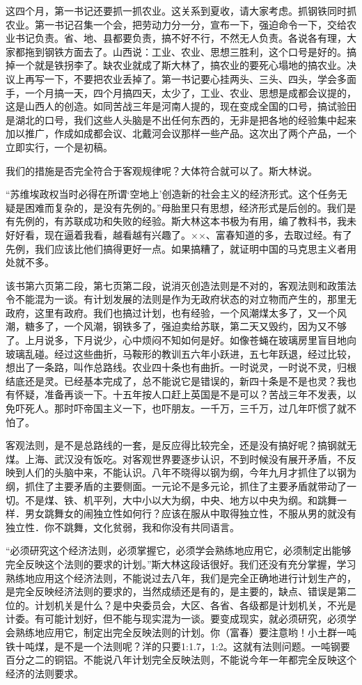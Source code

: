 这四个月，第一书记还要抓一抓农业。这关系到夏收，请大家考虑。抓钢铁同时抓农业。第一书记召集一个会，把劳动力分一分，宣布一下，强迫命令一下，交给农业书记负责。省、地、县都要负责，搞不好不行，不然无人负责。各说各有理，大家都拖到钢铁方面去了。山西说：工业、农业、思想三胜利，这个口号是好的。搞掉一个就是铁拐李了。缺农业就成了斯大林了，搞农业的要死心塌地的搞农业。决议上再写一下，不要把农业丢掉了。第一书记要心挂两头、三头、四头，学会多面手，一个月搞一天，四个月搞四天，太少了，工业、农业、思想是成都会议提的，这是山西人的创造。如同苦战三年是河南人提的，现在变成全国的口号，搞试验田是湖北的口号，我们这些人头脑是不出任何东西的，无非是把各地的经验集中起来加以推广，作成如成都会议、北戴河会议那样一些产品。这次出了两个产品，一个立即实行，一个是初稿。

我们的措施是否完全符合于客观规律呢？大体符合就可以了。斯大林说。

“苏维埃政权当时必得在所谓‘空地上’创造新的社会主义的经济形式。这个任务无疑是困难而复杂的，是没有先例的。”母胎里只有思想，经济形式是后创的。我们是有先例的，有苏联成功和失败的经验。斯大林这本书极为有用，编了教科书，我未好好看，现在逼着我看，越看越有兴趣了。××、富春知道的多，去取过经。有了先例，我们应该比他们搞得更好一点。如果搞糟了，就证明中国的马克思主义者用处就不多。

该书第六页第二段，第七页第二段，说消灭创造法则是不对的，客观法则和政策法令不能混为一谈。有计划发展的法则是作为无政府状态的对立物而产生的，那里无政府，这里有政府。我们也搞过计划，也有经验，一个风潮煤太多了，又一个风潮，糖多了，一个风潮，钢铁多了，强迫卖给苏联，第二天又毁约，因为又不够了。上月说多，下月说少，心中烦闷不知如何是好。如像苍蝇在玻璃房里盲目地向玻璃乱碰。经过这些曲折，马鞍形的教训五六年小跃进，五七年跃退，经过比较，想出了一条路，叫作总路线。农业四十条也有曲折。一时说灵，一时说不灵，归根结底还是灵。已经基本完成了，总不能说它是错误的，新四十条是不是也灵？我也有怀疑，准备再谈一下。十五年按人口赶上英国是不是可以？苦战三年不发表，以免吓死人。那时吓帝国主义一下，也吓朋友。一千万，三千万，过几年吓惯了就不怕了。

客观法则，是不是总路线的一套，是反应得比较完全，还是没有搞好呢？搞钢就无煤。上海、武汉没有饭吃。对客观世界要逐步认识，不到时候没有展开矛盾，不反映到人们的头脑中来，不能认识。八年不晓得以钢为纲，今年九月才抓住了以钢为纲，抓住了主要矛盾的主要侧面。一元论不是多元论，抓住了主要矛盾就带动了一切。不是煤、铁、机平列，大中小以大为纲，中央、地方以中央为纲。和跳舞一样．男女跳舞女的闹独立性如何行？应该在服从中取得独立性，不服从男的就没有独立性．你不跳舞，文化贫弱，我和你没有共同语言。

“必须研究这个经济法则，必须掌握它，必须学会熟练地应用它，必须制定出能够完全反映这个法则的要求的计划。”斯大林这段话很好。我们还没有充分掌握，学习熟练地应用这个经济法则，不能说过去八年，我们是完全正确地进行计划生产的，是完全反映经济法则的要求的，当然成绩还是有的，是主要的，缺点、错误是第二位的。计划机关是什么？是中央委员会，大区、各省、各级都是计划机关，不光是计委。有可能计划好，但不能与现实混为一谈。要变成现实，就必须研究，必须学会熟练地应用它，制定出完全反映法则的计划。你（富春）要注意哟！小土群一吨铁十吨煤，是不是一个法则呢？洋的只要1:1.7，1:2。这就有法则问题。一吨钢要百分之二的铜铝。不能说八年计划完全反映法则，不能说今年一年都完全反映这个经济的法则要求。

